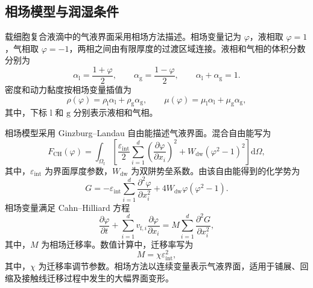 \subsection{相场模型与润湿条件}
\label{subsec:ch2_phase_field}

载细胞复合液滴中的气液界面采用相场方法描述。相场变量记为 $\varphi$，液相取 $\varphi=1$，气相取 $\varphi=-1$，两相之间由有限厚度的过渡区域连接。液相和气相的体积分数分别为
\begin{equation}
\alpha_{\mathrm l}=\frac{1+\varphi}{2},
\qquad
\alpha_{\mathrm g}=\frac{1-\varphi}{2},
\qquad
\alpha_{\mathrm l}+\alpha_{\mathrm g}=1.
\label{eq:ch2_phase_fraction}
\end{equation}
密度和动力黏度按相场变量插值为
\begin{equation}
\rho(\varphi)
=
\rho_{\mathrm l}\alpha_{\mathrm l}
+
\rho_{\mathrm g}\alpha_{\mathrm g},
\qquad
\mu(\varphi)
=
\mu_{\mathrm l}\alpha_{\mathrm l}
+
\mu_{\mathrm g}\alpha_{\mathrm g},
\label{eq:ch2_phase_properties}
\end{equation}
其中，下标 $\mathrm l$ 和 $\mathrm g$ 分别表示液相和气相。

相场模型采用 Ginzburg--Landau 自由能描述气液界面。混合自由能写为
\begin{equation}
F_{\mathrm{CH}}(\varphi)
=
\int_{\Omega_{\mathrm f}}
\left[
\frac{\varepsilon_{\mathrm{int}}}{2}
\sum_{i=1}^{d}
\left(
\frac{\partial\varphi}{\partial x_i}
\right)^2
+
W_{\mathrm{dw}}
\left(\varphi^2-1\right)^2
\right]
\mathrm d\Omega,
\label{eq:ch2_phase_free_energy}
\end{equation}
其中，$\varepsilon_{\mathrm{int}}$ 为界面厚度参数，$W_{\mathrm{dw}}$ 为双阱势垒系数。由该自由能得到的化学势为
\begin{equation}
G
=
-\varepsilon_{\mathrm{int}}
\sum_{i=1}^{d}
\frac{\partial^2\varphi}{\partial x_i^2}
+
4W_{\mathrm{dw}}\varphi\left(\varphi^2-1\right).
\label{eq:ch2_phase_auxiliary}
\end{equation}
相场变量满足 Cahn--Hilliard 方程
\begin{equation}
\frac{\partial\varphi}{\partial t}
+
\sum_{i=1}^{d}
v_{\mathrm f,i}
\frac{\partial\varphi}{\partial x_i}
=
M
\sum_{i=1}^{d}
\frac{\partial^2G}{\partial x_i^2},
\label{eq:ch2_cahn_hilliard}
\end{equation}
其中，$M$ 为相场迁移率。数值计算中，迁移率写为
\begin{equation}
M
=
\chi\varepsilon_{\mathrm{int}}^2,
\label{eq:ch2_phase_mobility}
\end{equation}
其中，$\chi$ 为迁移率调节参数。相场方法以连续变量表示气液界面，适用于铺展、回缩及接触线迁移过程中发生的大幅界面变形\cite{anderson1998diffuseinterface,jacqmin1999phasefield,badalassi2003phasefield,yue2004diffuseinterface}。

